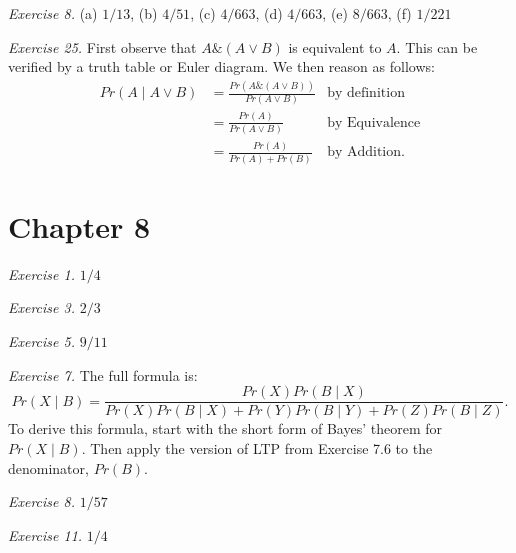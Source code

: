 \documentclass[justified]{tufte-book}
\newcommand{\given}{\mid}
\renewcommand{\wedge}{\mathbin{\&}}
\newcommand{\p}{Pr}
\theoremstyle{definition}
\theoremstyle{definition}
\theoremstyle{definition}
\theoremstyle{definition}
\theoremstyle{remark}
\begin{document}
\vspace{.5em}

\noindent
\emph{Exercise 8.} (a) \(1/13\), (b) \(4/51\), (c) \(4/663\), (d) \(4/663\), (e) \(8/663\), (f) \(1/221\)

\vspace{.5em}

\noindent
\emph{Exercise 25.} First observe that \(A \wedge (A \vee B)\) is equivalent to \(A\). This can be verified by a truth table or Euler diagram. We then reason as follows:
\[
  \begin{aligned}
    \p(A \given A \vee B) 
      & = \frac{\p(A \wedge (A \vee B))}{\p(A \vee B)}  & \text{by definition}\\
      & = \frac{\p(A)}{\p(A \vee B)}                    & \text{by Equivalence}\\
      & = \frac{\p(A)}{\p(A) + \p(B)}                   & \text{by Addition.}
  \end{aligned}
  \]

\hypertarget{chapter-8}{%
\section*{Chapter 8}\label{chapter-8}}

\noindent
\emph{Exercise 1.} \(1/4\)

\vspace{.5em}

\noindent
\emph{Exercise 3.} \(2/3\)

\vspace{.5em}

\noindent
\emph{Exercise 5.} \(9/11\)

\vspace{.5em}

\noindent
\emph{Exercise 7.} The full formula is:
\[
    \p(X \given B) 
      = \frac{\p(X)\p(B \given X)}{\p(X)\p(B \given X) + \p(Y)\p(B \given Y) + \p(Z)\p(B \given Z)}.
  \]
To derive this formula, start with the short form of Bayes' theorem for \(\p(X \given B)\). Then apply the version of LTP from Exercise 7.6 to the denominator, \(\p(B)\).

\vspace{.5em}

\noindent
\emph{Exercise 8.} \(1/57\)

\vspace{.5em}

\noindent
\emph{Exercise 11.} \(1/4\)
\end{document}
